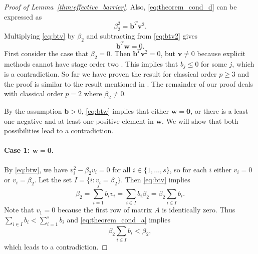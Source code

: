 \begin{proof}[Proof of Lemma~\ref{thm:effective_barrier}]
	Also, \eqref{eq:theorem_cond_d} can be expressed as
	\begin{equation}\label{eq:btv2}
		\beta_2^2 = \bm{b}^T\bm{v}^2.
	\end{equation}
        Multiplying \eqref{eq:btv} by $\beta_2$ and subtracting
        from \eqref{eq:btv2} gives
	\begin{equation}\label{eq:btw}
		\bm{b}^T\bm{w} = 0.
	\end{equation}
	First consider the case that $\beta_2 = 0$. 
	Then $\bm{b}^T\bm{v}^2 = 0$, but $\bm{v }\neq 0$ because explicit methods
	cannot have stage order two \cite{Ruuth2002}. This implies that $b_j \leq 0$ 
	for some $j$, which is a contradiction.
        So far we have proven the result for classical order $p \ge 3$
        and the proof is similar to the result mentioned in \cite{Ruuth2002}.
        The remainder of our proof deals with classical order $p=2$
        where $\beta_2 \neq 0$.

	By the assumption $\bm{b}>0$, \eqref{eq:btw} implies that either
	$\bm{w} = \bm{0}$, or there is a least one negative and at least one positive 
	element in $\bm{w}$.
	We will show that both possibilities lead to a contradiction.

	\paragraph{Case 1: $\bm{w} = \bm{0}$.}
	By \eqref{eq:btw}, we have $v_i^2 - \beta_2 v_i = 0$ for all $i \in \{1, \dots, s\}$, so 
        for each $i$ either $v_i = 0$ or $v_i = \beta_2$.
	Let the set $I = \{i : v_i = \beta_2\}$.%
	Then \eqref{eq:btv} implies 
	\begin{equation*}
		\beta_2 = \sum_{i=1}^s b_i v_i = \sum_{i \in I}b_i\beta_2 = \beta_2\sum_{i \in I}b_i.
	\end{equation*}
	Note that $v_1 = 0$ because the first row of matrix $A$ is identically zero. 
	Thus $\sum_{i\in I}b_i < \sum_{i=1}^s b_i$ and \eqref{eq:theorem_cond_a} 
	implies
	\begin{equation*}
		\beta_2\sum_{i \in I}b_i< \beta_2,
	\end{equation*} 
	which leads to a contradiction.


\end{proof}
